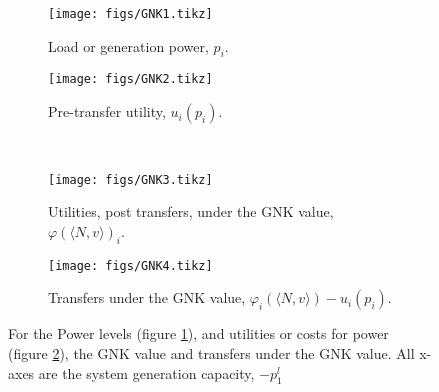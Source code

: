

\begin{figure}[]
	
	\begin{subfigure}{.48\linewidth}
		\texttt{[image: figs/GNK1.tikz]}%
		\caption{ Load or generation power, $p_i$.}\label{fig:1a}
	\end{subfigure}
	\begin{subfigure}{.48\linewidth}
		\texttt{[image: figs/GNK2.tikz]}%
		\caption{ Pre-transfer utility, $u_i(p_i)$.}\label{fig:1b}
	\end{subfigure}
\vspace{5mm}\\
	\begin{subfigure}{.48\linewidth}
		\texttt{[image: figs/GNK3.tikz]}%
		\caption{ Utilities, post transfers, under the GNK value, $\varphi(\langle N,v \rangle)_i$.}\label{fig:1c}
	\end{subfigure}
	\begin{subfigure}{.48\linewidth}
		\texttt{[image: figs/GNK4.tikz]}%
		\caption{ Transfers under the GNK value, $\varphi_i(\langle N,v \rangle)-u_i(p_i)$.}\label{fig:1d}
	\end{subfigure}
	\vspace{0.3\baselineskip}
	\caption[Power-levels and utility imputations under GNK value for example network]{For the Power levels (figure \ref{fig:1a}), and utilities or costs for power (figure \ref{fig:1b}), the GNK value and transfers under the GNK value. All x-axes are the system generation capacity, $-p_1^l$}\label{fig:1}
\end{figure}






